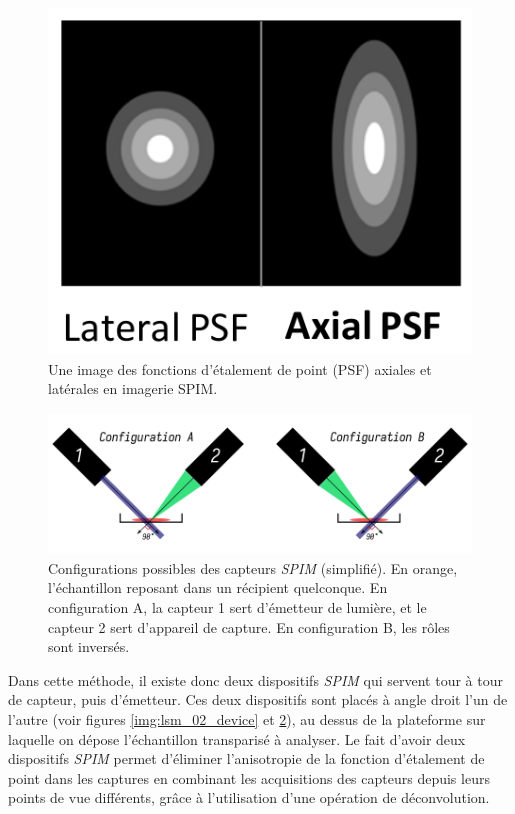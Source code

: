 {{        %
		\begin{figure}[!h]
			\centering
			\includegraphics[width=0.3\linewidth]{./img/spim_01_psf.png}
			\captionsetup{width=.8\linewidth}
			\caption{Une image des fonctions d'étalement de point (PSF) axiales et latérales en imagerie SPIM.}
			\label{img:spim_01_point_spread_function}
		\end{figure}

		\begin{figure}[!h]
		    \centering
		    \includegraphics[width=.9\linewidth]{img/config_spim.png}
		    \captionsetup{width=.8\linewidth}
		    \caption{Configurations possibles des capteurs \textit{SPIM} (simplifié). En orange, l'échantillon reposant dans un récipient quelconque. En configuration A, la capteur 1 sert d'émetteur de lumière, et le capteur 2 sert d'appareil de capture. En configuration B, les rôles sont inversés.}
		    \label{img:spim_config}
		\end{figure}

		Dans cette méthode, il existe donc deux dispositifs \textit{SPIM} qui servent tour à tour de capteur, puis d'émetteur. Ces deux dispositifs sont placés à angle droit l'un de l'autre (voir figures \ref{img:lsm_02_device} et \ref{img:spim_config}), au dessus de la plateforme sur laquelle on dépose l'échantillon transparisé à analyser. Le fait d'avoir deux dispositifs \textit{SPIM} permet d'éliminer l'anisotropie de la fonction d'étalement de point dans les captures en combinant les acquisitions des capteurs depuis leurs points de vue différents, grâce à l'utilisation d'une opération de déconvolution.
		
}}
